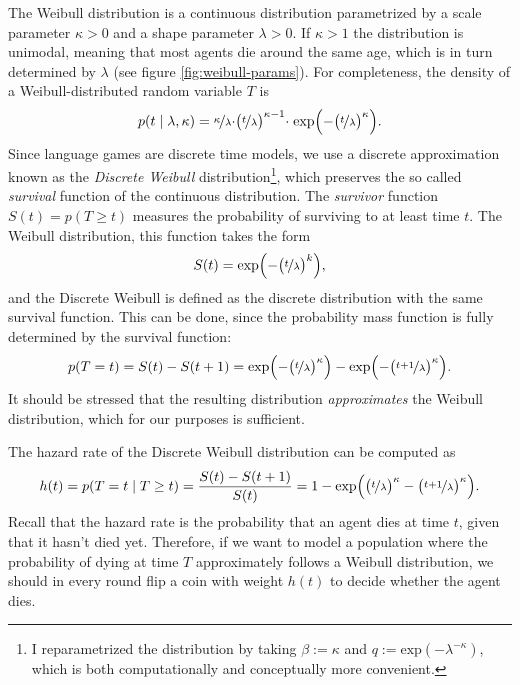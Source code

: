 \documentclass{../src/bcthesispart}
\begin{document}
The Weibull distribution \parencite{Weibull1951} is a continuous distribution parametrized by a scale parameter $\kappa>0$ and a shape parameter $\lambda>0$. 
If $\kappa>1$ the distribution is unimodal, meaning that most agents die around the same age, which is in turn determined by $\lambda$ (see figure \ref{fig:weibull-params}).
For completeness, the density of a Weibull-distributed random variable $T$ is
\begin{align}
	p(t \mid \lambda, \kappa) = \nicefrac{\kappa}{\lambda} \cdot \bigr(\nicefrac{t}{\lambda}\bigl)^{\kappa-1} \cdot \;\text{exp}\Bigl(-\bigr(\nicefrac{t}{\lambda}\bigl)^{\kappa}\Bigr).
\end{align}
Since language games are discrete time models, we use a discrete approximation known as the \emph{Discrete Weibull} distribution\footnote{I reparametrized the distribution by taking $\beta := \kappa$ and $q := \text{exp} ( - \lambda^{-\kappa})$, which is both computationally and conceptually more convenient.}\parencite{Nakagawa1975}, which preserves the so called \emph{survival} function of the continuous distribution.
The \emph{survivor} function $S(t) = p(T \ge t)$ measures the probability of surviving to at least time $t$.
The Weibull distribution, this function takes the form
\begin{equation}
	S(t) = \text{exp}\Bigl(	-\bigl(\nicefrac{t}{\lambda}\bigr)^k\Bigr),
\end{equation}
and the Discrete Weibull is defined as the discrete distribution with the same survival function.
This can be done, since the probability mass function is fully determined by the survival function:
\begin{equation}
p(T = t) = S(t) - S(t+1) = \text{exp}\Bigl(	- \bigl(\nicefrac{t}{\lambda}\bigr)^\kappa \Bigr) - \text{exp}\Bigl(- \bigl(\nicefrac{t+1}{\lambda}\bigr)^\kappa\Bigr).
\end{equation}
It should be stressed that the resulting distribution \emph{approximates} the Weibull distribution, which for our purposes is sufficient.




The hazard rate of the Discrete Weibull distribution can be computed as
\begin{align}
	h(t) 
		= p(T= t \mid T\ge t)
		= \frac{S(t) - S(t+1)}{S(t)}
		= 1 - \text{exp}\Bigl( \bigl(\nicefrac{t}{\lambda}\bigr)^{\kappa} -  \bigl(\nicefrac{t+1}{\lambda}\bigr)^{\kappa}\Bigr).
\end{align}
Recall that the hazard rate is the probability that an agent dies at time $t$, given that it hasn’t died yet. 
Therefore, if we want to model a population where the probability of dying at time $T$ approximately follows a Weibull distribution, we should in every round flip a coin with weight $h(t)$ to decide whether the agent dies. 
\end{document}
